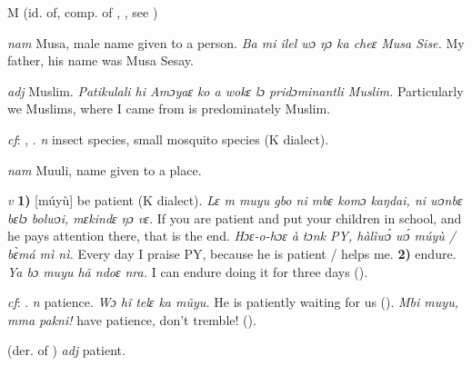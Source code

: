 \begin{letter}{M}
 (id. of, comp. of , , see ) 

 \textit{nam} Musa, male name given to a person. \textit{Ba mi ilel wɔ ŋɔ ka cheɛ Musa Sise.} My father, his name was Musa Sesay.

 \textit{adj} Muslim. \textit{Patikulali hi Amɔyaɛ ko a wokɛ lɔ pridɔminantli Muslim.} Particularly we Muslims, where I came from is predominately Muslim.

 \textit{cf}: , . \textit{n} insect species, small mosquito species (K dialect). 

 \textit{nam} Muuli, name given to a place. 

 \textit{v} \textbf{1)} [múyù] be patient (K dialect). \textit{Lɛ m muyu gbo ni mbɛ komɔ kaŋdai, ni wɔnbɛ bɛlɔ bolwɔi, mɛkindɛ ŋɔ vɛ.} If you are patient and put your children in school, and he pays attention there, that is the end. \textit{Hɔɛ-o-hɔɛ à tɔnk PY, hàlìwɔ́ wɔ́ múyù / bɛ̀má mì nì.} Every day I praise PY, because he is patient / helps me. \textbf{2)} endure. \textit{Ya bɔ muyu hã ndoɛ nra.} I can endure doing it for three days (\citealt{Pichl1967}). 

 \textit{cf}: . \textit{n} patience. \textit{Wɔ hĩ telɛ ka mũyu.} He is patiently waiting for us (\citealt{Pichl1967}). \textit{Mbi muyu, mma pakni!} have patience, don't tremble! (\citealt{Pichl1967}). 

 (der. of ) \textit{adj} patient.


\end{letter}
